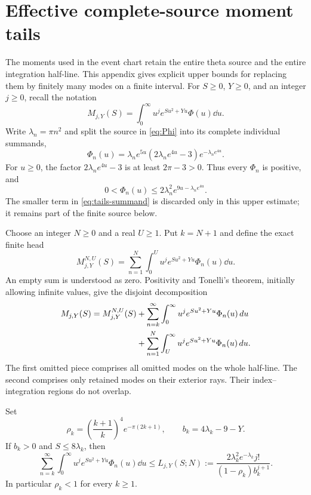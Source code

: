 \section{Effective complete-source moment tails}\label{sec:tails}

The moments used in the event chart retain the entire theta source and
the entire integration half-line. This appendix gives explicit upper
bounds for replacing them by finitely many modes on a finite interval.
For $S\ge0$, $Y\ge0$, and an integer $j\ge0$, recall the notation
\begin{equation}\label{eq:tails-moment}
 M_{j,Y}(S)=\int_0^\infty u^j e^{Su^2+Yu}\Phi(u)\dd u.
\end{equation}
Write $\lambda_n=\pi n^2$ and split the source in
\eqref{eq:Phi} into its complete individual summands,
\begin{equation}\label{eq:tails-summand}
 \Phi_n(u)=\lambda_n e^{5u}(2\lambda_ne^{4u}-3)
                         e^{-\lambda_ne^{4u}}.
\end{equation}
For $u\ge0$, the factor $2\lambda_ne^{4u}-3$ is at least
$2\pi-3>0$. Thus every $\Phi_n$ is positive, and
\begin{equation}\label{eq:tails-leading}
 0<\Phi_n(u)\le 2\lambda_n^2e^{9u-\lambda_ne^{4u}}.
\end{equation}
The smaller term in \eqref{eq:tails-summand} is discarded only in
this upper estimate; it remains part of the finite source below.

Choose an integer $N\ge0$ and a real $U\ge1$. Put $k=N+1$ and define
the exact finite head
\begin{equation}\label{eq:tails-head}
 M^{N,U}_{j,Y}(S)=\sum_{n=1}^{N}
       \int_0^U u^j e^{Su^2+Yu}\Phi_n(u)\dd u.
\end{equation}
An empty sum is understood as zero. Positivity and Tonelli's theorem,
initially allowing infinite values, give the disjoint decomposition
\begin{align}
 M_{j,Y}(S)=M^{N,U}_{j,Y}(S)
 &+\sum_{n=k}^\infty\int_0^\infty
                  u^j e^{Su^2+Yu}\Phi_n(u)\,d u\notag\\
 &+\sum_{n=1}^{N}\int_U^\infty
                  u^j e^{Su^2+Yu}\Phi_n(u)\,d u.
 \label{eq:tails-decomposition}
\end{align}
The first omitted piece comprises all omitted modes on the whole
half-line. The second comprises only retained modes on their exterior
rays. Their index--integration regions do not overlap.

\begin{proposition}\label{prop:tails-modes}
Set
\begin{equation}\label{eq:tails-mode-parameters}
 \rho_k=\left(\frac{k+1}{k}\right)^4e^{-\pi(2k+1)},
 \qquad b_k=4\lambda_k-9-Y.
\end{equation}
If $b_k>0$ and $S\le8\lambda_k$, then
\begin{equation}\label{eq:tails-modes}
 \sum_{n=k}^\infty\int_0^\infty
       u^j e^{Su^2+Yu}\Phi_n(u)\dd u
 \le L_{j,Y}(S;N):=
 \frac{2\lambda_k^2e^{-\lambda_k}j!}
                  {(1-\rho_k)b_k^{j+1}}.
\end{equation}
In particular $\rho_k<1$ for every $k\ge1$.
\end{proposition}

